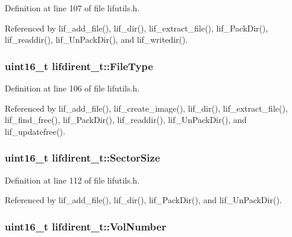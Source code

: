 Definition at line 107 of file lifutils.\+h.



Referenced by lif\+\_\+add\+\_\+file(), lif\+\_\+dir(), lif\+\_\+extract\+\_\+file(), lif\+\_\+\+Pack\+Dir(), lif\+\_\+readdir(), lif\+\_\+\+Un\+Pack\+Dir(), and lif\+\_\+writedir().

\subsubsection[{\texorpdfstring{File\+Type}{FileType}}]{\setlength{\rightskip}{0pt plus 5cm}uint16\+\_\+t lifdirent\+\_\+t\+::\+File\+Type}\hypertarget{structlifdirent__t_a48901a6b2b10471927397b3b569e386a}{}\label{structlifdirent__t_a48901a6b2b10471927397b3b569e386a}


Definition at line 106 of file lifutils.\+h.



Referenced by lif\+\_\+add\+\_\+file(), lif\+\_\+create\+\_\+image(), lif\+\_\+dir(), lif\+\_\+extract\+\_\+file(), lif\+\_\+find\+\_\+free(), lif\+\_\+\+Pack\+Dir(), lif\+\_\+readdir(), lif\+\_\+\+Un\+Pack\+Dir(), and lif\+\_\+updatefree().

\subsubsection[{\texorpdfstring{Sector\+Size}{SectorSize}}]{\setlength{\rightskip}{0pt plus 5cm}uint16\+\_\+t lifdirent\+\_\+t\+::\+Sector\+Size}\hypertarget{structlifdirent__t_a4c2a8fab6d73c7f1baa502c1ebef8658}{}\label{structlifdirent__t_a4c2a8fab6d73c7f1baa502c1ebef8658}


Definition at line 112 of file lifutils.\+h.



Referenced by lif\+\_\+add\+\_\+file(), lif\+\_\+dir(), lif\+\_\+\+Pack\+Dir(), and lif\+\_\+\+Un\+Pack\+Dir().

\subsubsection[{\texorpdfstring{Vol\+Number}{VolNumber}}]{\setlength{\rightskip}{0pt plus 5cm}uint16\+\_\+t lifdirent\+\_\+t\+::\+Vol\+Number}\hypertarget{structlifdirent__t_a9510c4f024400cff22c8abb54a4aca65}{}\label{structlifdirent__t_a9510c4f024400cff22c8abb54a4aca65}


